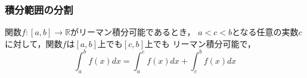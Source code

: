 \documentclass[./index]{subfiles}
\begin{document}
\subsubsection{積分範囲の分割}

\begin{screen}
    \begin{proposition}
        関数$f: [a, b] \rightarrow \mathbb{R}$がリーマン積分可能であるとき，
        $a < c < b$となる任意の実数$c$に対して，関数$f$は$[a, b]$上でも$[c, b]$上でも
        リーマン積分可能で，
        \begin{equation}
            \int_a^b f(x) dx = \int_a^c f(x) dx + \int_c^b f(x) dx
        \end{equation}
    \end{proposition}
\end{screen}
\end{document}

